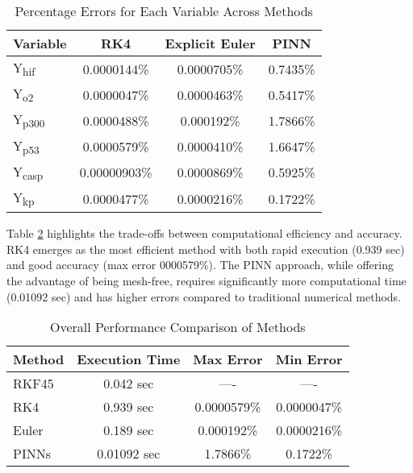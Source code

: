 \documentclass[conference]{IEEEtran}
\begin{document}
\vspace{\bigskipamount}


\begin{table}[htbp]
\centering
\caption{Percentage Errors for Each Variable Across Methods}
\begin{tabular}{lccc}
\toprule
\textbf{Variable} & \textbf{RK4} & \textbf{Explicit Euler} & \textbf{PINN} \\
\midrule
Y\textsubscript{hif}  & 0.0000144\%     & 0.0000705\%     & 0.7435\%     \\
Y\textsubscript{o2}   & 0.0000047\%    & 0.0000463\%     & 0.5417\%     \\
Y\textsubscript{p300} & 0.0000488\%     & 0.000192\%      & 1.7866\%    \\
Y\textsubscript{p53}  & 0.0000579\%     & 0.0000410\%     & 1.6647\%     \\
Y\textsubscript{casp} & 0.00000903\%   & 0.0000869\%     & 0.5925\%     \\
Y\textsubscript{kp}   & 0.0000477\%     & 0.0000216\%     & 0.1722\%     \\
\bottomrule
\end{tabular}
\label{tab:variable_errors}
\end{table}

Table \ref{tab:performance_comparison} highlights the trade-offs between computational efficiency and accuracy. RK4 emerges as the most efficient method with both rapid execution (0.939 sec) and good accuracy (max error 0000579\%). The PINN approach, while offering the advantage of being mesh-free, requires significantly more computational time (0.01092  sec) and has higher errors compared to traditional numerical methods.

\begin{table}[htbp]
\centering
\caption{Overall Performance Comparison of Methods}
\begin{tabular}{lccc}
\toprule
\textbf{Method} & \textbf{Execution Time} & \textbf{Max Error} & \textbf{Min Error} \\
\midrule
RKF45 & 0.042 sec & ---- & ---- \\
RK4 & 0.939 sec & 0.0000579\% & 0.0000047\% \\
Euler & 0.189 sec & 0.000192\% & 0.0000216\% \\
PINNs & 0.01092 sec & 1.7866\% & 0.1722\% \\
\bottomrule
\end{tabular}
\label{tab:performance_comparison}
\end{table}
\end{document}
